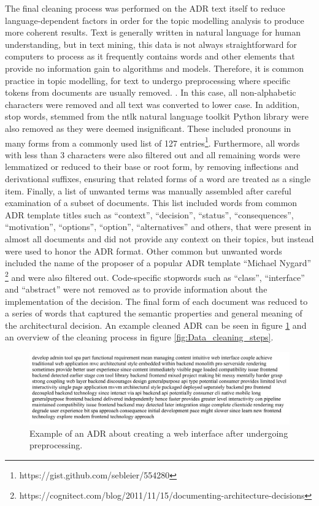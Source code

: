         The final cleaning process was performed on the ADR text itself to reduce language-dependent factors in order for the topic modelling analysis to produce more coherent results. Text is generally written in natural language for human understanding, but in text mining, this data is not always straightforward for computers to process as it frequently contains words and other elements that provide no information gain to algorithms and models. Therefore, it is common practice in topic modelling, for text to undergo preprocessing where specific tokens from documents are usually removed. \cite{topic-modelling-text-cleaning, text-mining-lda}. In this case, all non-alphabetic characters were removed and all text was converted to lower case. In addition, stop words, stemmed from the ntlk natural language toolkit Python library were also removed as they were deemed insignificant. These included pronouns in many forms from a commonly used list of 127 entries\footnote{https://gist.github.com/sebleier/554280}. Furthermore, all words with less than 3 characters were also filtered out and all remaining words were lemmatized or reduced to their base or root form, by removing inflections and derivational suffixes, ensuring that related forms of a word are treated as a single item. Finally, a list of unwanted terms was manually assembled after careful examination of a subset of documents. This list included words from common ADR template titles such as ``context'', ``decision'', ``status'', ``consequences'', ``motivation'', ``options'', ``option'', ``alternatives'' and others, that were present in almost all documents and did not provide any context on their topics, but instead were used to honor the ADR format. Other common but unwanted words included the name of the proposer of a popular ADR template ``Michael Nygard'' \footnote{https://cognitect.com/blog/2011/11/15/documenting-architecture-decisions} and were also filtered out. Code-specific stopwords such as ``class'', ``interface'' and ``abstract'' were not removed as to provide information about the implementation of the decision. The final form of each document was reduced to a series of words that captured the semantic properties and general meaning of the architectural decision. An example cleaned ADR can be seen in figure \ref{fig:Cleaned_ADR} and an overview of the cleaning process in figure \ref{fig:Data_cleaning_steps}.
        
        \begin{figure}
            \centering
            \includegraphics[scale=0.6]{figures/adr_cleaned_example.jpeg}
            \caption{Example of an ADR about creating a web interface after undergoing preprocessing.}
            \label{fig:Cleaned_ADR}
        \end{figure}

